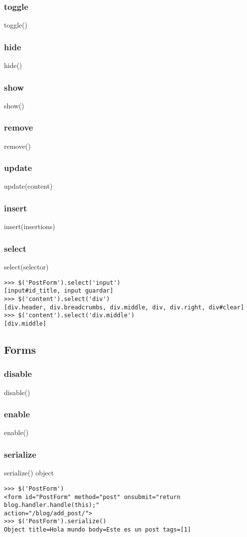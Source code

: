 {{\subsubsection*{toggle}
toggle()
\subsubsection*{hide}
hide()
\subsubsection*{show}
show()
\subsubsection*{remove}
remove()
\subsubsection*{update}
update(content)
\subsubsection*{insert}
insert(insertions)
\subsubsection*{select}
select(selector)

\begin{lstlisting}[style=consola]
>>> $('PostForm').select('input')
[input#id_title, input guardar]
>>> $('content').select('div')
[div.header, div.breadcrumbs, div.middle, div, div.right, div#clear]
>>> $('content').select('div.middle')
[div.middle]
\end{lstlisting}

\subsection{Forms}
\subsubsection*{disable}
disable()
\subsubsection*{enable}
enable()
\subsubsection*{serialize}
serialize() \rightarrow object
\begin{lstlisting}[style=consola]
>>> $('PostForm')
<form id="PostForm" method="post" onsubmit="return blog.handler.handle(this);"
action="/blog/add_post/">
>>> $('PostForm').serialize()
Object title=Hola mundo body=Este es un post tags=[1]
\end{lstlisting}

}}
